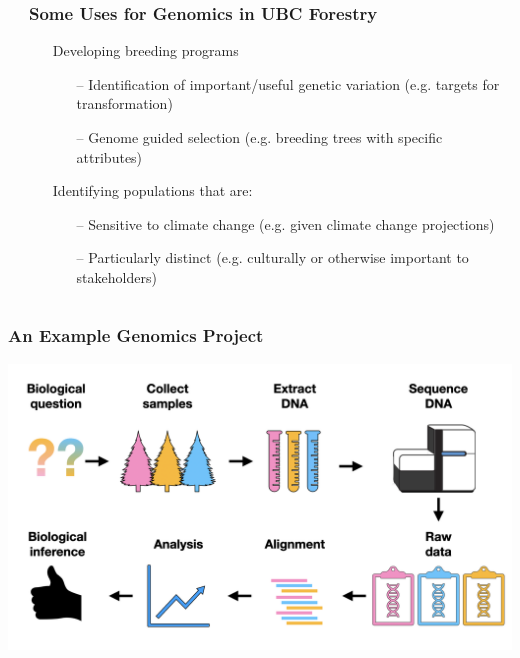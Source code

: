 \documentclass{beamer}
\begin{document}
\begin{frame}
\begin{columns}
\begin{column}{0.1\textwidth}
		\end{column}
		\begin{column}{0.95\textwidth}
			\frametitle{Some Uses for Genomics in UBC Forestry}
			\begin{itemize}
				\item[] Developing breeding programs
				\begin{itemize}
					\item[--] Identification of important/useful genetic variation  (e.g. targets for transformation)
					\item[--] Genome guided selection (e.g. breeding trees with specific attributes)
				\end{itemize}
				\item[ ]Identifying populations that are:
				\begin{itemize}
					\item[--] Sensitive to climate change (e.g. given climate change projections) 
					\item[--] Particularly distinct (e.g. culturally or otherwise important to stakeholders) 
				\end{itemize}
			\end{itemize}
		\end{column}
	\end{columns}
\end{frame}




\begin{frame}
	\frametitle{An Example Genomics Project}
	\centering	\includegraphics[keepaspectratio, width  =\textwidth]{img/bio_project}
\end{frame}
\end{document}
